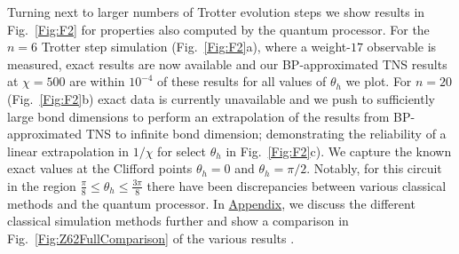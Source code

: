 \documentclass[%
 superscriptaddress,
 amsmath,amssymb,
 prx, nofootinbib,
 twocolumn
]{revtex4-2}
\begin{document}
Turning next to larger numbers of Trotter evolution steps we show results in Fig.~\ref{Fig:F2} for properties also
computed by the quantum processor. For the $n = 6$ Trotter step simulation (Fig.~\ref{Fig:F2}a), where a weight-$17$ observable is measured, exact results are now available \cite{Liao2023} and our BP-approximated TNS results at $\chi = 500$ are within $10^{-4}$ of these results for all values of $\theta_{h}$ we plot. 
For $n = 20$ (Fig.~\ref{Fig:F2}b) exact data is currently unavailable and we push to sufficiently large bond dimensions to perform an extrapolation of the results from BP-approximated TNS to infinite bond dimension; demonstrating the reliability of a linear extrapolation in $1/\chi$ for select $\theta_{h}$ in Fig.~\ref{Fig:F2}c).  We capture the known exact values at the Clifford points $\theta_{h} = 0$ and $\theta_{h} = \pi/2$. Notably, for this circuit in the region $\frac{\pi}{8} \leq \theta_{h} \leq \frac{3\pi}{8}$ there have been discrepancies between various classical methods and the quantum processor. 
In \hyperref[Subsec:Comparison]{Appendix}, we discuss the different classical simulation methods further and show a comparison in   Fig.~\ref{Fig:Z62FullComparison} of the various results \cite{kim2023, Zalatel2023, Chan2023, Liao2023, begušić2023, kechedzhi2023}. 
\end{document}
